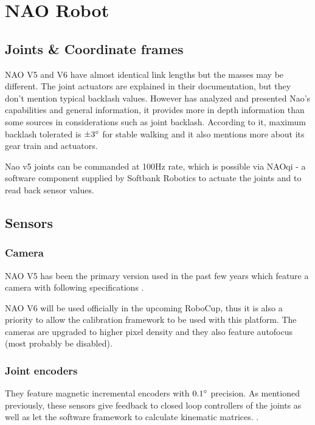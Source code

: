 \documentclass[english, printversion, nomenclature, notitle]{tuvisionthesis} %
\begin{document}
\section{NAO Robot}


\subsection{Joints \& Coordinate frames}

NAO V5 and V6 have almost identical link lengths but the masses may be different. The joint actuators are explained in their documentation, but they don't mention typical backlash values. However \cite{gouaillier_nao_2008} has analyzed and presented Nao's capabilities and general information, it provides more in depth information than some sources in considerations such as joint backlash. According to it, maximum backlash tolerated is $\pm 3\degree$ for stable walking and it also mentions more about its gear train and actuators.

Nao v5 joints can be commanded at 100Hz rate, which is possible via NAOqi - a software component supplied by Softbank Robotics to actuate the joints and to read back sensor values.

\subsection{Sensors}
\subsubsection{Camera}
NAO V5 has been the primary version used in the past few years which feature a camera with following specifications \cite{AldebaranDocumentationV5_Head}.

NAO V6 will be used officially in the upcoming RoboCup, thus it is also a priority to allow the calibration framework to be used with this platform. The cameras are upgraded to higher pixel density and they also feature autofocus (most probably be disabled).

\subsubsection{Joint encoders}
\label{subsub:jointEncoders}

They feature magnetic incremental encoders with $0.1\degree$ precision. As mentioned previously, these sensors give feedback to closed loop controllers of the joints as well as let the software framework to calculate kinematic matrices. . 
\end{document}

